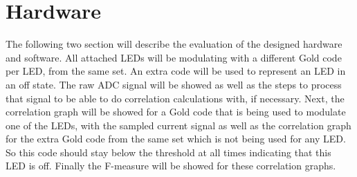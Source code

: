 
\section{Hardware}
\label{sec:hardware-evaluation}

The following two section will describe the evaluation of the designed hardware and software.
All attached LEDs will be modulating with a different Gold code per LED, from the same set.
An extra code will be used to represent an LED in an off state.
The raw ADC signal will be showed as well as the steps to process that signal to be able to do correlation calculations with, if necessary.
Next, the correlation graph will be showed for a Gold code that is being used to modulate one of the LEDs, with the sampled current signal as well as the correlation graph for the extra Gold code from the same set which is not being used for any LED. So this code should stay below the threshold at all times indicating that this LED is off.
Finally the F-measure will be showed for these correlation graphs.







